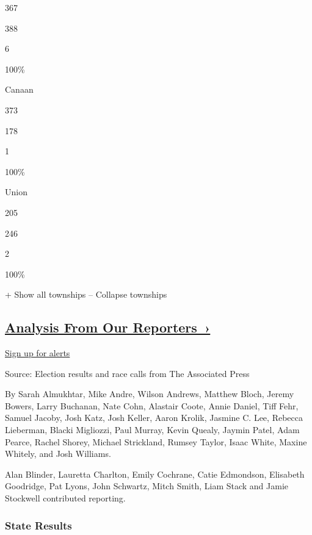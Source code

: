 367

388

6

100\%

Canaan

373

178

1

100\%

Union

205

246

2

100\%

+ Show all townships -- Collapse townships

\hypertarget{analysis-from-our-reporters-}{%
\subsection{\texorpdfstring{\href{https://www.nytimes3xbfgragh.onion/interactive/2018/11/06/us/elections/live-midterm-election-analysis-updates.html}{Analysis
From Our
Reporters~›}}{Analysis From Our Reporters~›}}\label{analysis-from-our-reporters-}}

\protect\hyperlink{}{Sign up for alerts}

Source: Election results and race calls from The Associated Press

By Sarah Almukhtar, Mike Andre, Wilson Andrews, Matthew Bloch, Jeremy
Bowers, Larry Buchanan, Nate Cohn, Alastair Coote, Annie Daniel, Tiff
Fehr, Samuel Jacoby, Josh Katz, Josh Keller, Aaron Krolik, Jasmine C.
Lee, Rebecca Lieberman, Blacki Migliozzi, Paul Murray, Kevin Quealy,
Jaymin Patel, Adam Pearce, Rachel Shorey, Michael Strickland, Rumsey
Taylor, Isaac White, Maxine Whitely, and Josh Williams.

Alan Blinder, Lauretta Charlton, Emily Cochrane, Catie Edmondson,
Elisabeth Goodridge, Pat Lyons, John Schwartz, Mitch Smith, Liam Stack
and Jamie Stockwell contributed reporting.

\hypertarget{state-results}{%
\subsubsection{State Results}\label{state-results}}

